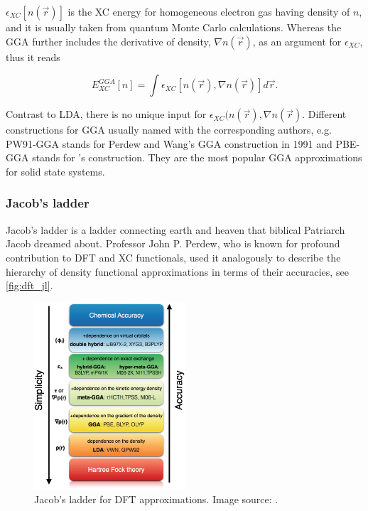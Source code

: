 $\epsilon_{XC}[n(\vec{r})]$ is the XC energy for homogeneous electron gas having density of $n$, and it is usually taken from quantum Monte Carlo calculations. Whereas the GGA further includes the derivative of density, $\nabla n(\vec{r})$, as an argument for $\epsilon_{XC}$, thus it reads

\begin{equation}
E_{XC}^{GGA}[n]=\int \epsilon_{XC}[n(\vec{r}),\nabla n(\vec{r})]d\vec{r}.
\end{equation}

Contrast to LDA, there is no unique input for $\epsilon_{XC}(n(\vec{r}),\nabla n(\vec{r})$. Different constructions for GGA usually named with the corresponding authors, e.g. PW91-GGA stands for Perdew and Wang's GGA construction in 1991\cite{Perdew1991,Perdew1992} and PBE-GGA stands for \citet{Perdew1996}'s construction. They are the most popular GGA approximations for solid state systems. 

\subsubsection{Jacob's ladder}

Jacob's ladder is a ladder connecting earth and heaven that biblical Patriarch Jacob dreamed about. Professor John P. Perdew, who is known for profound contribution to DFT and XC functionals, used it analogously to describe the hierarchy of density functional approximations in terms of their accuracies, see \autoref{fig:dft_jl}.  

\begin{figure}[htbp!] 
\centering  
\includegraphics[width=0.5\textwidth]{jacobs.png}
\caption{ Jacob's ladder for DFT approximations. Image source: \cite{Peng2016}.}  
\label{fig:dft_jl}
\end{figure} 

